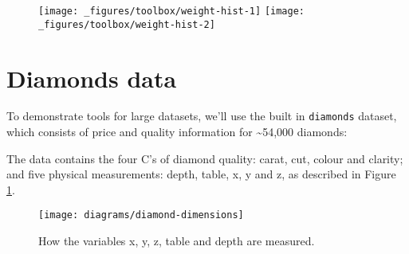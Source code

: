 \begin{figure}[H]
  \texttt{[image: \_figures/toolbox/weight-hist-1]}%
  \texttt{[image: \_figures/toolbox/weight-hist-2]}
\end{figure}

\hypertarget{sec:diamonds}{\section{Diamonds data}\label{sec:diamonds}}

To demonstrate tools for large datasets, we'll use the built in
\texttt{diamonds} dataset, which consists of price and quality
information for \textasciitilde{}54,000 diamonds:

\begin{Shaded}
\begin{Highlighting}[]
\CommentTok{#> }
\end{Highlighting}
\end{Shaded}

The data contains the four C's of diamond quality: carat, cut, colour
and clarity; and five physical measurements: depth, table, x, y and z,
as described in Figure \ref{fig:diamond-dim}.

\begin{figure}[htbp]
  \centering
    \texttt{[image: diagrams/diamond-dimensions]}
  \caption{How the variables x, y, z, table and depth are measured.}
  \label{fig:diamond-dim}
\end{figure}


